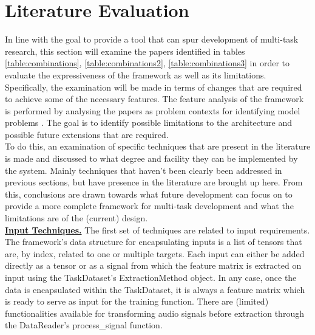 \section{Literature Evaluation} \label{evaluation:literature}


In line with the goal to provide a tool that can spur development of multi-task research, this section will examine the papers identified in tables \ref{table:combinations}, \ref{table:combinations2}, \ref{table:combinations3} in order to evaluate the expressiveness of the framework as well as its limitations. Specifically, the examination will be made in terms of changes that are required to achieve some of the necessary features. The feature analysis of the framework is performed by analysing the papers as problem contexts for identifying model problems \citep{brown1996framework}. The goal is to identify possible limitations to the architecture and possible future extensions that are required. \\

To do this, an examination of specific techniques that are present in the literature is made and discussed to what degree and facility they can be implemented by the system. Mainly techniques that haven't been clearly been addressed in previous sections, but have presence in the literature are brought up here. From this, conclusions are drawn towards what future development can focus on to provide a more complete framework for multi-task development and what the limitations are of the (current) design.\\



\underline{\textbf{Input Techniques.}} The first set of techniques are related to input requirements. The framework's data structure for encapsulating inputs is a list of tensors that are, by index, related to one or multiple targets. Each input can either be added directly as a tensor or as a signal from which the feature matrix is extracted on input using the TaskDataset's ExtractionMethod object. In any case, once the data is encapsulated within the TaskDataset, it is always a feature matrix which is ready to serve as input for the training function. There are (limited) functionalities available for transforming audio signals before extraction through the DataReader's process\_signal function.\\

